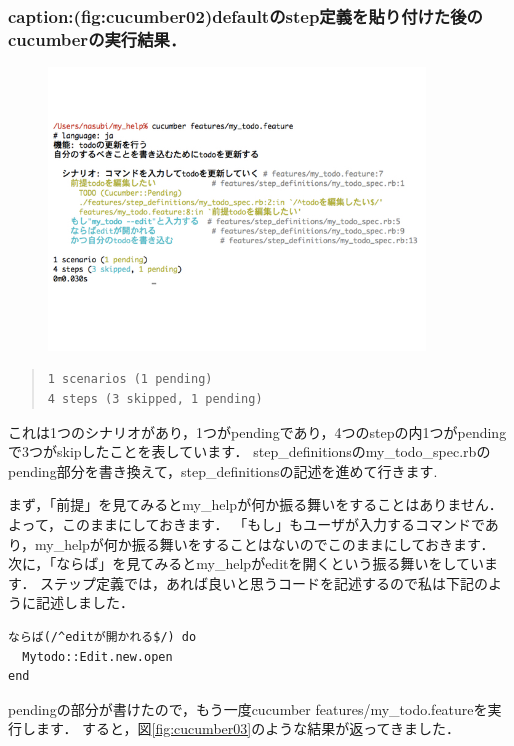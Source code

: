 \subsubsection{caption:(fig:cucumber02)defaultのstep定義を貼り付けた後のcucumberの実行結果．}
\begin{figure}[htbp]\begin{center}
\includegraphics[width=10cm,bb= 0 0 737 553]{../figs/./cucumber02.001.jpg}
\caption{}
\label{default}\end{center}\end{figure}\begin{quote}\begin{verbatim}
1 scenarios (1 pending)
4 steps (3 skipped, 1 pending)
\end{verbatim}\end{quote}
これは1つのシナリオがあり，1つがpendingであり，4つのstepの内1つがpendingで3つがskipしたことを表しています．
step\_definitionsのmy\_todo\_spec.rbのpending部分を書き換えて，step\_definitionsの記述を進めて行きます.

まず，「前提」を見てみるとmy\_helpが何か振る舞いをすることはありません．
よって，このままにしておきます．
「もし」もユーザが入力するコマンドであり，my\_helpが何か振る舞いをすることはないのでこのままにしておきます．
次に，「ならば」を見てみるとmy\_helpがeditを開くという振る舞いをしています．
ステップ定義では，あれば良いと思うコードを記述するので私は下記のように記述しました．
\begin{lstlisting}[style=customCsh]
ならば(/^editが開かれる$/) do
  Mytodo::Edit.new.open
end
\end{lstlisting}
pendingの部分が書けたので，もう一度cucumber features/my\_todo.featureを実行します．
すると，図\ref{fig:cucumber03}のような結果が返ってきました．

